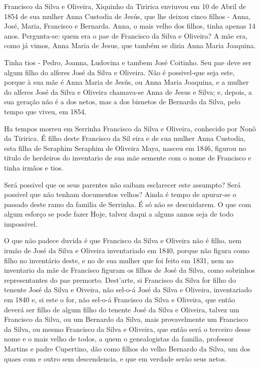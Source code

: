 Francisco da Silva e Oliveira, Xiquinho da Tiririca enviuvou em 10 de Abril de 1854 de sua mulher Anna Custodia de Jesús, que lhe deixou cinco filhos - Anna, José, Maria, Francisco e Bernarda. Anna, o mais velho dos filhos, tinha apenas 14 anos. Pergunta-se: quem era o pae de Francisco da Silva e  Oliveira? A mãe era, como já vimos, Anna Maria de Jesus, que também se dizia Anna Maria Joaquina.

Tinha tios - Pedro, Joanna, Ludovina e tambem José Coitinho. Seu pae deve ser algum filho do alferes José da Silva e Oliveira. Não é possivel-que seja este, porque à sua mãe é Anna Maria de Jesús, ou Anna Maria Joaquina, e a mulher do alferes José da Silva e Oliveira chamava-se Anna de Jesus e Silva; e, depois, a sua geração não é a dos netos, mas a dos bisnetos de Bernardo da Silva, pelo tempo que viveu, em 1854.

Ha tempos morreu em Serrinha Francisco da Silva e Oliveira, conhecido por Nonô da Tiririca. É filho deste Francisco da Sil
eira e de sua mulher Anna Custodia, esta filha de Seraphim Seraphim de Oliveira Maya, nasceu em 1846, figurou no titulo de herdeiros do inventario de sua mãe semente com o nome de Francisco e tinha irmãos e tios.

Será possivel que os seus parentes não saibam esclarecer este assumpto? Será possivel que não tenham documentos velhos? Ainda é
tempo de apurar-se o passado deste ramo da familia de Serrinha. É só não se descuidarem. O que com algum esforço se pode fazer Hoje, talvez daqui a alguns annos seja de todo impossivel.

O que não padece duvida é que Francisco da Silva e Oliveira não é filho, nem irmão de José da Silva e Oliveira inventariado em 1840, porque não figura como filho no inventário deste, e no de sua mulher que foi feito em 1831, nem no inventario da mãe de Francisco figuram os filhos de José da Silva, como sobrinhos representantes do pae premorto. Dest'arte, si Francisco da Silva
for filho do tenente José da Silva e Oiveira, não sel-o-á José da Silva e Oliveira, inventariado em 1840 e, si este o for, não sel-o-á Francisco da Silva e Oliveira, que então deverá ser filho de algum filho do tenente José da Silva e Oliveira, talvez um Francisco da Silva, ou um Bernardo da Silva, mais provavelmente um Francisco da Silva, ou mesmo Francisco da Silva e Oliveira,
que então será o terceiro desse nome e o mais velho de todos, a quem o genealogistas da familia, professor Martins e padre Cupertino, dão como filhos do velho Bernardo da Silva, um dos quaes com e outro sem descendencia, e que em verdade serão seus netos.


